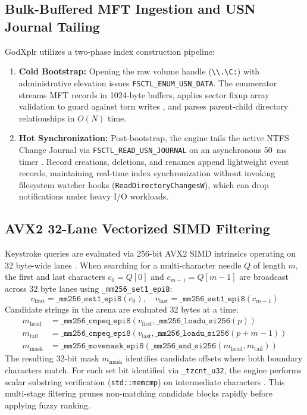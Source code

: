 \documentclass[conference]{IEEEtran}
\begin{document}
\subsection{Bulk-Buffered MFT Ingestion and USN Journal Tailing}
GodXplr utilizes a two-phase index construction pipeline:
\begin{enumerate}
    \item \textbf{Cold Bootstrap:} Opening the raw volume handle (\texttt{\textbackslash\textbackslash.\textbackslash C:}) with administrative elevation issues \texttt{FSCTL\_ENUM\_USN\_DATA}. The enumerator streams MFT records in 1024-byte buffers, applies sector fixup array validation to guard against torn writes \cite{russinovich_internals}, and parses parent-child directory relationships in $O(N)$ time.
    \item \textbf{Hot Synchronization:} Post-bootstrap, the engine tails the active NTFS Change Journal via \texttt{FSCTL\_READ\_USN\_JOURNAL} on an asynchronous 50~ms timer \cite{ms_usn}. Record creations, deletions, and renames append lightweight event records, maintaining real-time index synchronization without invoking filesystem watcher hooks (\texttt{ReadDirectoryChangesW}), which can drop notifications under heavy I/O workloads.
\end{enumerate}

\subsection{AVX2 32-Lane Vectorized SIMD Filtering}
Keystroke queries are evaluated via 256-bit AVX2 SIMD intrinsics operating on 32 byte-wide lanes \cite{intel_avx2}. When searching for a multi-character needle $Q$ of length $m$, the first and last characters $c_0 = Q[0]$ and $c_{m-1} = Q[m-1]$ are broadcast across 32 byte lanes using \texttt{\_mm256\_set1\_epi8}:
\begin{equation}
v_{\text{first}} = \texttt{\_mm256\_set1\_epi8}(c_0), \quad v_{\text{last}} = \texttt{\_mm256\_set1\_epi8}(c_{m-1})
\end{equation}
Candidate strings in the arena are evaluated 32 bytes at a time:
\begin{align}
m_{\text{head}} &= \texttt{\_mm256\_cmpeq\_epi8}(v_{\text{first}}, \texttt{\_mm256\_loadu\_si256}(p)) \\
m_{\text{tail}} &= \texttt{\_mm256\_cmpeq\_epi8}(v_{\text{last}}, \texttt{\_mm256\_loadu\_si256}(p + m - 1)) \\
m_{\text{mask}} &= \texttt{\_mm256\_movemask\_epi8}(\texttt{\_mm256\_and\_si256}(m_{\text{head}}, m_{\text{tail}}))
\end{align}
The resulting 32-bit mask $m_{\text{mask}}$ identifies candidate offsets where both boundary characters match. For each set bit identified via \texttt{\_tzcnt\_u32}, the engine performs scalar substring verification (\texttt{std::memcmp}) on intermediate characters \cite{knuth_string}. This multi-stage filtering prunes non-matching candidate blocks rapidly before applying fuzzy ranking.
\end{document}
